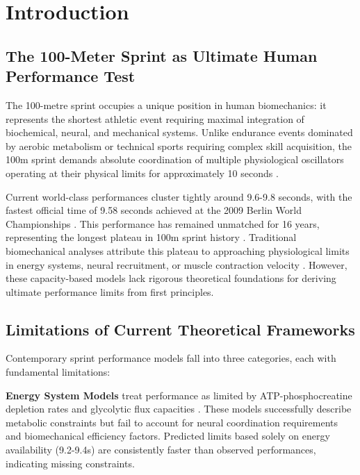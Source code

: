 \documentclass[10pt]{article}
\begin{document}
\section{Introduction}

\subsection{The 100-Meter Sprint as Ultimate Human Performance Test}

The 100-metre sprint occupies a unique position in human biomechanics: it represents the shortest athletic event requiring maximal integration of biochemical, neural, and mechanical systems. Unlike endurance events dominated by aerobic metabolism or technical sports requiring complex skill acquisition, the 100m sprint demands absolute coordination of multiple physiological oscillators operating at their physical limits for approximately 10 seconds \citep{mero1992biomechanics,nagahara2018development}.

Current world-class performances cluster tightly around 9.6-9.8 seconds, with the fastest official time of 9.58 seconds achieved at the 2009 Berlin World Championships \citep{bolt2009berlin}. This performance has remained unmatched for 16 years, representing the longest plateau in 100m sprint history \citep{iaaf_statistics_2023}. Traditional biomechanical analyses attribute this plateau to approaching physiological limits in energy systems, neural recruitment, or muscle contraction velocity \citep{bundle2003high,weyand2010faster}. However, these capacity-based models lack rigorous theoretical foundations for deriving ultimate performance limits from first principles.

\subsection{Limitations of Current Theoretical Frameworks}

Contemporary sprint performance models fall into three categories, each with fundamental limitations:

\textbf{Energy System Models} treat performance as limited by ATP-phosphocreatine depletion rates and glycolytic flux capacities \citep{hirvonen1987breakdown,gaitanos1993human}. These models successfully describe metabolic constraints but fail to account for neural coordination requirements and biomechanical efficiency factors. Predicted limits based solely on energy availability (9.2-9.4s) are consistently faster than observed performances, indicating missing constraints.
\end{document}

